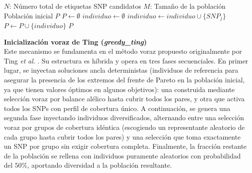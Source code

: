 \begin{algorithm}[H]
\caption{Inicialización aleatoria densa (\textit{random\_dense})}
\begin{algorithmic}[1]
\Require $N$: Número total de etiquetas SNP candidatos
\Require $M$: Tamaño de la población
\Ensure Población inicial $P$
\State $P \gets \emptyset$ 
 
    \State $individuo \gets \emptyset$ 
     
         
            \State $individuo \gets individuo \cup \{SNP_j\}$ 
        \EndIf
    \EndFor
    \State $P \gets P \cup \{individuo\}$
\EndFor
\State \Return $P$
\end{algorithmic}
\end{algorithm}

\textbf{Inicialización voraz de Ting (\textit{greedy\_ting})} \\
Este mecanismo se fundamenta en el método voraz propuesto originalmente por Ting \textit{et al.} \cite{ting2010multi}. Su estructura es híbrida y opera en tres fases secuenciales. En primer lugar, se inyectan soluciones ancla deterministas (individuos de referencia para asegurar la presencia de los extremos del frente de Pareto en la población inicial, ya que tienen valores óptimos en algunos objetivos): una construida mediante selección voraz por balance alélico hasta cubrir todos los pares, y otra que activa todos los SNPs con perfil de cobertura único. A continuación, se genera una segunda fase inyectando individuos diversificados, alternando entre una selección voraz por grupos de cobertura idéntica (escogiendo un representante aleatorio de cada grupo hasta cubrir todos los pares) y una selección que toma exactamente un SNP por grupo sin exigir cobertura completa. Finalmente, la fracción restante de la población se rellena con individuos puramente aleatorios con probabilidad del $50\%$, aportando diversidad a la población resultante.


